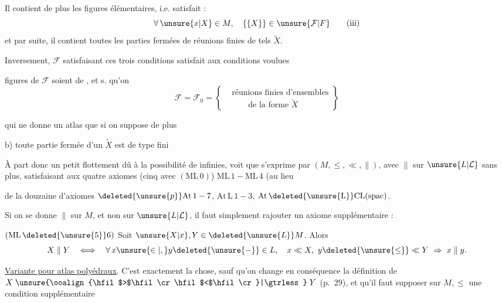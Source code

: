 Il contient de plus les  figures élémentaires, i.e. satisfait :
\begingroup\makeatletter\tagsleft@true\makeatother
\[
 \forall\,\unsure{x|X}\in M,\quad \{\{X\}\}\in\unsure{\mathcal F|F}
 \tag*{(iii)}
\]
\endgroup
et par suite, il contient toutes les parties fermées de réunions finies de tels $\widetilde X$.

Inversement,  $\mathcal F$ satisfaisant ces trois conditions satisfait aux conditions voulues

  figures de $\mathcal F$ soient de ,  et s. qu'on 
\begingroup\makeatletter\tagsleft@true\makeatother
\[
 \mathcal F=\mathcal F_{0}=
 \left\{\begin{aligned}
 &\text{réunions finies d'ensembles}\\
 &\qquad\text{de la forme }\widetilde X
 \end{aligned}\right\}
 \tag*{a)}
\]
\endgroup

 qui ne donne un atlas que si on suppose de plus

b) toute partie fermée d'un $\widetilde X$  est de type fini

À part donc un petit flottement dû à la possibilité de    infinies,  voit que  s'exprime par $(M,{\leq},{\ll},{\parallel})$, avec $\parallel$  sur $\unsure{L|\mathcal L}$ sans plus,  satisfaisant aux quatre axiomes (cinq avec $(\mathrm{ML\,0})$) $\mathrm{ML\,1}-\mathrm{ML\,4}$ (au lieu

de la douzaine d'axiomes $\deleted{\unsure{p}}\mathrm{At\,1}-7$, $\mathrm{At\,L\,1}-3$, $\mathrm{At\,\deleted{\unsure{L}}CL(spac)}$.

Si on se donne $\parallel$ sur $M$, et non sur $\unsure{L|\mathcal L}$, il faut simplement rajouter un axiome supplémentaire :

$(\mathrm{ML}\,\deleted{\unsure{5}}6)$ Soit $\unsure{X|x},Y\in\deleted{\unsure{L}}M$. Alors
\[
 X\parallel Y\quad\Longleftrightarrow\quad \forall\,x\unsure{\in|,}y\deleted{\unsure{-}}\in L,\quad
 x\ll X,\ y\deleted{\unsure{\leq}}\ll Y\ \Rightarrow\ x\parallel y.
\]

\uline{Variante pour atlas polyédraux}.  C'est exactement la \unsure{$=$} chose, sauf qu'on change en conséquence la définition de $X\mathrel{\unsure{\ooalign{\hfil$>$\hfil\cr\hfil$<$\hfil\cr}|\gtrless}}Y$ (p.~29), et qu'il faut supposer sur $M,\leq$ une condition supplémentaire

